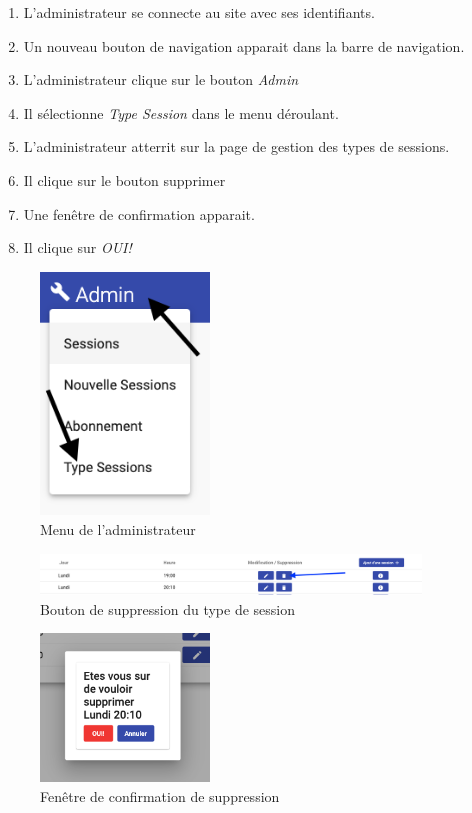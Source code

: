 \begin{enumerate}
	\item L'administrateur se connecte au site avec ses identifiants. 
	\item Un nouveau bouton de navigation apparait dans la barre de navigation. 
	\item L'administrateur clique sur le bouton \textit{Admin}
	\item Il sélectionne \textit{Type Session} dans le menu déroulant. 
	\item L'administrateur atterrit sur la page de gestion des types de sessions. 
	\item Il clique sur le bouton supprimer
	\item Une fenêtre de confirmation apparait. 
	\item Il clique sur \textit{OUI!} 
\end{enumerate}


\begin{figure}[h]
	\includegraphics[width=0.4\textwidth,center]{Figures/us13-1}
	\caption{Menu de l'administrateur}
\end{figure}

\vspace{\baselineskip}
\begin{figure}[h]
	\includegraphics[width=0.9\textwidth,center]{Figures/us14-1}
	\caption{Bouton de suppression du type de session}
\end{figure}

\newpage
\begin{figure}[h]
	\includegraphics[width=0.4\textwidth,center]{Figures/us14-2}
	\caption{Fenêtre de confirmation de suppression}
\end{figure}

